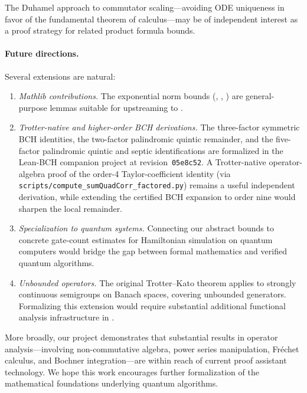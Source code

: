 The Duhamel approach to commutator scaling---avoiding ODE uniqueness in favor
of the fundamental theorem of calculus---may be of independent interest as a
proof strategy for related product formula bounds.

\paragraph{Future directions.}
Several extensions are natural:
\begin{enumerate}
  \item \emph{Mathlib contributions.}
    The exponential norm bounds (,
    ,
    )
    are general-purpose lemmas suitable for upstreaming to \Mathlib.

  \item \emph{Trotter-native and higher-order BCH derivations.}
    The three-factor symmetric BCH identities, the two-factor
    palindromic quintic remainder, and the five-factor palindromic
    quintic and septic identifications are formalized in the Lean-BCH
    companion project at revision~\texttt{05e8c52}. A Trotter-native
    operator-algebra proof of the order-4 Taylor-coefficient identity
    (via \texttt{scripts/compute\_sumQuadCorr\_factored.py}) remains a
    useful independent derivation, while extending the certified BCH
    expansion to order nine would sharpen the local remainder.

  \item \emph{Specialization to quantum systems.}
    Connecting our abstract bounds to concrete gate-count estimates for
    Hamiltonian simulation on quantum computers would bridge the gap between
    formal mathematics and verified quantum algorithms.

  \item \emph{Unbounded operators.}
    The original Trotter--Kato theorem applies to strongly continuous
    semigroups on Banach spaces, covering unbounded generators.
    Formalizing this extension would require substantial additional
    functional analysis infrastructure in \Mathlib.
\end{enumerate}

More broadly, our project demonstrates that substantial results in operator
analysis---involving non-commutative algebra, power series manipulation,
Fr\'{e}chet calculus, and Bochner integration---are within reach of current
proof assistant technology.
We hope this work encourages further formalization of the mathematical
foundations underlying quantum algorithms.
